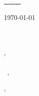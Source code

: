 \documentclass[12pt]{letter}
\begin{document}
\selectfont
\AddToShipoutPictureBG{%
\color{gr}
\AtPageUpperLeft{\rule[-1.6in]{\paperwidth}{1.6in}}
}

\begin{center}
{\Huge \scshape \myname}\par
{\jobtitle}

\href{mailto:\myemail}{\faEnvelope~ \myemail}\hfill
\href{https://www.\mywebsite}{\faGlobe~ \mywebsite}\hfill
\href{tel:\phone}{\faPhone~ \phone}\hfill
\faMapMarker~ \mylocation
\end{center}

\vspace{0.2in}
\onehalfspacing
\fontsize{13}{15}\selectfont
\today\hfill

\vspace{0.1in}
\recipient\\%
\fullcompany\\
\city,~\state\\
\\
\vspace{-0.1in}\greeting~\recipientfirstname,\\


\vspace{-0.1in}\setlength\parindent{24pt}




\vspace{0.5in}
\begin{flushright}

\closer,\\
\vspace{0.1in}
\myname\\

\end{flushright}
\end{document}
